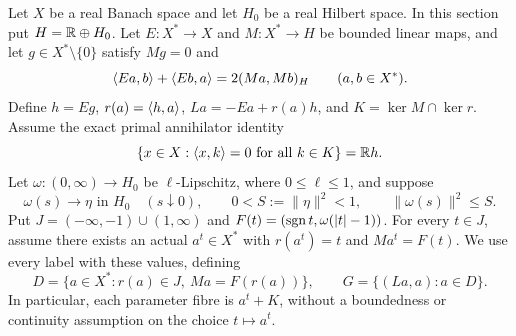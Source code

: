 Let $X$ be a real Banach space and let $H_0$ be a real Hilbert space.
In this section put $H=\mathbb R\oplus H_0$. Let
$E:X^*\to X$ and $M:X^*\to H$ be bounded linear maps, and let
$g\in X^*\setminus\{0\}$ satisfy $Mg=0$ and
\begin{equation}
\langle Ea,b\rangle+\langle Eb,a\rangle=2(Ma,Mb)_H
\qquad(a,b\in X^*).
\label{eq:abs-bilinear}
\end{equation}
Define $h=Eg$, $r(a)=\langle h,a\rangle$, $La=-Ea+r(a)h$, and
$K=\ker M\cap\ker r$. Assume the exact primal annihilator identity
\begin{equation}
\{x\in X:\langle x,k\rangle=0\ \hbox{for all }k\in K\}=\mathbb R h.
\label{eq:abs-annihilator}
\end{equation}
Let $\omega:(0,\infty)\to H_0$ be $\ell$-Lipschitz, where
$0\le\ell\le1$, and suppose
\begin{equation}
\omega(s)\longrightarrow\eta\text{ in }H_0\quad(s\downarrow0),
\qquad 0<S:=\|\eta\|^2<1,\qquad \|\omega(s)\|^2\le S.
\label{eq:abs-tail}
\end{equation}
Put $J=(-\infty,-1)\cup(1,\infty)$ and
$F(t)=(\operatorname{sgn} t,\omega(|t|-1))$. For every $t\in J$, assume
there exists an actual $a^t\in X^*$ with $r(a^t)=t$ and
$Ma^t=F(t)$. We use every label with these values, defining
\begin{equation}
D=\{a\in X^*:r(a)\in J,\ Ma=F(r(a))\},\qquad
G=\{(La,a):a\in D\}.
\label{eq:abs-full-graph}
\end{equation}
In particular, each parameter fibre is $a^t+K$, without a boundedness
or continuity assumption on the choice $t\mapsto a^t$.


